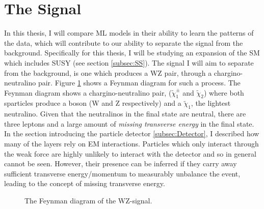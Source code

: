 \section{The Signal}\label{sec:signal}
In this thesis, I will compare \ac{ML} models in their ability to learn the patterns of the data, which will contribute  
to our ability to separate the signal from the background. Specifically for this thesis, I will be studying an expansion of the 
\ac{SM} which includes \ac{SUSY} (see section \ref{subsec:SS}). The signal I will aim to separate from the background, is one 
which produces a WZ pair, through a chargino-neutralino pair. Figure \ref{fig:signal} shows a Feynman diagram for 
such a process. The Feynman diagram shows a chargino-neutralino pair, ($\tilde{\chi}_1^\pm$ and $\tilde{\chi}_2$)
where both sparticles produce a boson (W and Z respectively) and a $\tilde{\chi}_1$, the lightest neutralino. Given that the 
neutralinos in the final state are neutral, there are three leptons and a large amount of \emph{missing transverse energy} in the final state.
In the section introducing the particle detector \ref{subsec:Detector}, I described how many of the layers rely on \ac{EM} interactions. 
Particles which only interact through the weak force are highly unlikely to interact with the detector and so in general cannot be seen. 
However, their presence can be inferred if they carry away sufficient transverse energy/momentum to measurably unbalance the event, leading to the concept of 
missing transverse energy.
\begin{figure}[H]
    \centering
    \caption{The Feynman diagram of the WZ-signal.}
    \label{fig:signal}
\end{figure}